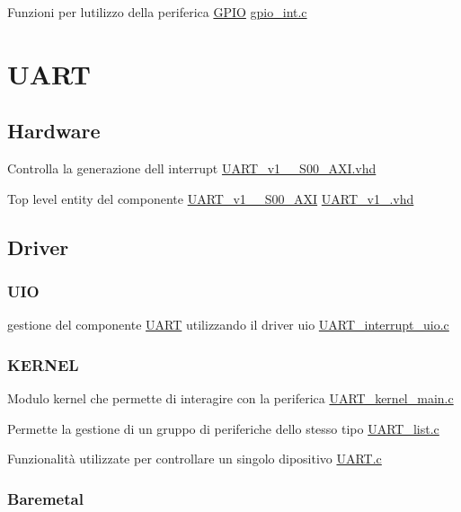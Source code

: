 \begin{DoxyItemize}
\item Funzioni per l\textquotesingle{}utilizzo della periferica \hyperlink{structGPIO}{G\+P\+IO}  \hyperlink{gpio__int_8c}{gpio\+\_\+int.\+c}
\end{DoxyItemize}\hypertarget{index_UART}{}\section{U\+A\+RT}\label{index_UART}
\hypertarget{index_Hardware}{}\subsection{Hardware}\label{index_Hardware}

\begin{DoxyItemize}
\item Controlla la generazione dell\textquotesingle{} interrupt \hyperlink{UART__v1__0__S00__AXI_8vhd}{U\+A\+R\+T\+\_\+v1\+\_\+\_\+\+S00\+\_\+\+A\+X\+I.\+vhd}
\item Top level entity del componente \hyperlink{classUART__v1__0__S00__AXI}{U\+A\+R\+T\+\_\+v1\+\_\+\_\+\+S00\+\_\+\+A\+XI} \hyperlink{UART__v1__0_8vhd}{U\+A\+R\+T\+\_\+v1\+\_.\+vhd} 
\end{DoxyItemize}\hypertarget{index_Driver}{}\subsection{Driver}\label{index_Driver}
\hypertarget{index_UIO}{}\subsubsection{U\+IO}\label{index_UIO}

\begin{DoxyItemize}
\item gestione del componente \hyperlink{structUART}{U\+A\+RT} utilizzando il driver uio \hyperlink{UART__interrupt__uio_8c}{U\+A\+R\+T\+\_\+interrupt\+\_\+uio.\+c} 
\end{DoxyItemize}\hypertarget{index_KERNEL}{}\subsubsection{K\+E\+R\+N\+EL}\label{index_KERNEL}

\begin{DoxyItemize}
\item Modulo kernel che permette di interagire con la periferica \hyperlink{UART__kernel__main_8c}{U\+A\+R\+T\+\_\+kernel\+\_\+main.\+c}
\item Permette la gestione di un gruppo di periferiche dello stesso tipo \hyperlink{UART__list_8c}{U\+A\+R\+T\+\_\+list.\+c}
\item Funzionalità utilizzate per controllare un singolo dipositivo \hyperlink{UART_8c}{U\+A\+R\+T.\+c} 
\end{DoxyItemize}\hypertarget{index_Baremetal}{}\subsubsection{Baremetal}\label{index_Baremetal}

